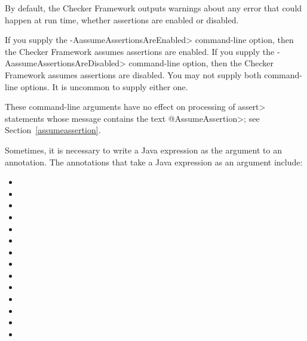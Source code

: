 By default, the Checker Framework outputs warnings about any error that
could happen at run time, whether assertions are enabled or disabled.

If you supply the \<-AassumeAssertionsAreEnabled> command-line option, then
the Checker Framework assumes assertions are enabled.  If you supply the
\<-AassumeAssertionsAreDisabled> command-line option, then the Checker
Framework assumes assertions are disabled.  You may not supply both
command-line options.  It is uncommon to supply either one.

These command-line arguments have no effect on processing of \<assert>
statements whose message contains the text \<@AssumeAssertion>; see
Section~\ref{assumeassertion}.



Sometimes, it is necessary to write a Java expression as the argument to an
annotation.  The annotations that take a Java
expression as an argument include:

\begin{itemize}
\item {}
\item {}
\item {}
\item {}
\item {}
\item {}
\item {}
\item {}
\item {}
\item {}
\item {}
\item {}
\item {}
\item {}
\end{itemize}

